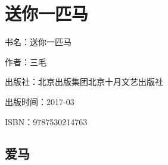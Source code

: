 

\section{送你一匹马}


\par 书名：送你一匹马
\par 作者：三毛
\par 出版社：北京出版集团北京十月文艺出版社
\par 出版时间：2017-03
\par ISBN：9787530214763




\subsection{爱马}


